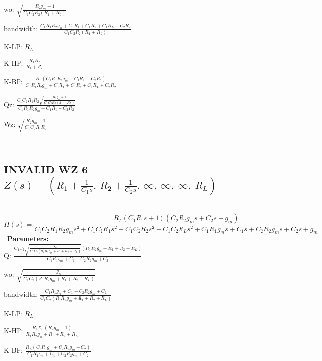\documentclass{article}
\begin{document}
wo: $\sqrt{\frac{R_{2} g_{m} + 1}{C_{1} C_{2} R_{2} \left(R_{1} + R_{L}\right)}}$\ 

bandwidth: $\frac{C_{1} R_{1} R_{2} g_{m} + C_{1} R_{1} + C_{1} R_{2} + C_{1} R_{L} + C_{2} R_{2}}{C_{1} C_{2} R_{2} \left(R_{1} + R_{L}\right)}$\ 

K-LP: $R_{L}$\ 

K-HP: $\frac{R_{1} R_{L}}{R_{1} + R_{L}}$\ 

K-BP: $\frac{R_{L} \left(C_{1} R_{1} R_{2} g_{m} + C_{1} R_{1} + C_{2} R_{2}\right)}{C_{1} R_{1} R_{2} g_{m} + C_{1} R_{1} + C_{1} R_{2} + C_{1} R_{L} + C_{2} R_{2}}$\ 

Qz: $\frac{C_{1} C_{2} R_{1} R_{2} \sqrt{\frac{R_{2} g_{m} + 1}{C_{1} C_{2} R_{2} \left(R_{1} + R_{L}\right)}}}{C_{1} R_{1} R_{2} g_{m} + C_{1} R_{1} + C_{2} R_{2}}$\ 

Wz: $\sqrt{\frac{R_{2} g_{m} + 1}{C_{1} C_{2} R_{1} R_{2}}}$\ 

\ 

\subsection{INVALID-WZ-6 $Z(s) = \left( R_{1} + \frac{1}{C_{1} s}, \  R_{2} + \frac{1}{C_{2} s}, \  \infty, \  \infty, \  \infty, \  R_{L}\right)$ } \ 
\textbf{\[H(s) = \frac{R_{L} \left(C_{1} R_{1} s + 1\right) \left(C_{2} R_{2} g_{m} s + C_{2} s + g_{m}\right)}{C_{1} C_{2} R_{1} R_{2} g_{m} s^{2} + C_{1} C_{2} R_{1} s^{2} + C_{1} C_{2} R_{2} s^{2} + C_{1} C_{2} R_{L} s^{2} + C_{1} R_{1} g_{m} s + C_{1} s + C_{2} R_{2} g_{m} s + C_{2} s + g_{m}}\] } \ 
\textbf{Parameters:}\\ 

Q: $\frac{C_{1} C_{2} \sqrt{\frac{g_{m}}{C_{1} C_{2} \left(R_{1} R_{2} g_{m} + R_{1} + R_{2} + R_{L}\right)}} \left(R_{1} R_{2} g_{m} + R_{1} + R_{2} + R_{L}\right)}{C_{1} R_{1} g_{m} + C_{1} + C_{2} R_{2} g_{m} + C_{2}}$\ 

wo: $\sqrt{\frac{g_{m}}{C_{1} C_{2} \left(R_{1} R_{2} g_{m} + R_{1} + R_{2} + R_{L}\right)}}$\ 

bandwidth: $\frac{C_{1} R_{1} g_{m} + C_{1} + C_{2} R_{2} g_{m} + C_{2}}{C_{1} C_{2} \left(R_{1} R_{2} g_{m} + R_{1} + R_{2} + R_{L}\right)}$\ 

K-LP: $R_{L}$\ 

K-HP: $\frac{R_{1} R_{L} \left(R_{2} g_{m} + 1\right)}{R_{1} R_{2} g_{m} + R_{1} + R_{2} + R_{L}}$\ 

K-BP: $\frac{R_{L} \left(C_{1} R_{1} g_{m} + C_{2} R_{2} g_{m} + C_{2}\right)}{C_{1} R_{1} g_{m} + C_{1} + C_{2} R_{2} g_{m} + C_{2}}$\ 
\end{document}
